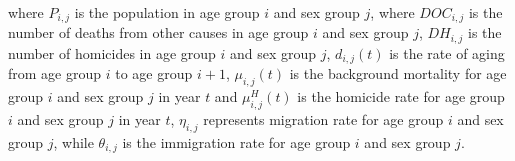 \documentclass[
]{jss}
\begin{document}
where \(P_{i, j}\) is the population in age group \(i\) and sex group
\(j\), where \(DOC_{i, j}\) is the number of deaths from other causes in
age group \(i\) and sex group \(j\), \(DH_{i, j}\) is the number of
homicides in age group \(i\) and sex group \(j\), \(d_{i, j}(t)\) is the
rate of aging from age group \(i\) to age group \(i+1\),
\(\mu_{i, j}(t)\) is the background mortality for age group \(i\) and
sex group \(j\) in year \(t\) and \(\mu_{i, j}^{H}(t)\) is the homicide
rate for age group \(i\) and sex group \(j\) in year \(t\),
\(\eta_{i, j}\) represents migration rate for age group \(i\) and sex
group \(j\), while \(\theta_{i, j}\) is the immigration rate for age
group \(i\) and sex group \(j\).
\end{document}
